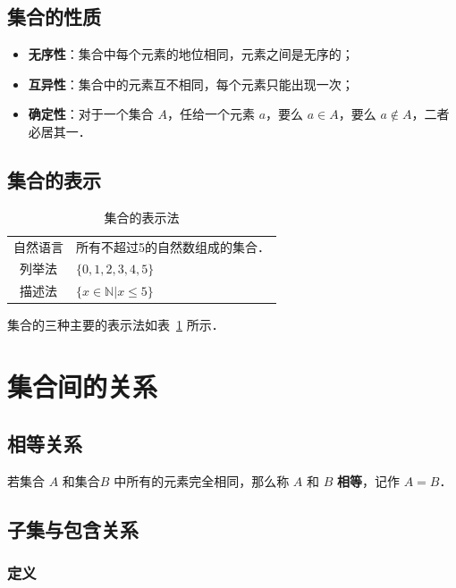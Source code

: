\documentclass[a4paper,openany]{ctexbook}
\begin{document}
\subsection{集合的性质}

\begin{itemize}
    \item \textbf{无序性}：集合中每个元素的地位相同，元素之间是无序的；
    \item \textbf{互异性}：集合中的元素互不相同，每个元素只能出现一次；
    \item \textbf{确定性}：对于一个集合 \(A\)，任给一个元素 \(a\)，要么 \(a \in A\)，要么 \(a \not\in A\)，二者必居其一．
\end{itemize}

\subsection{集合的表示}

\begin{table}
    \centering
    \begin{tabular}{cl}
        \toprule
        自然语言 & 所有不超过5的自然数组成的集合．    \\
        列举法   & \(\{0,1,2,3,4,5\}\)                \\
        描述法   & \(\{x \in \mathbb{N} | x \le 5\}\) \\
        \bottomrule
    \end{tabular}
    \caption{集合的表示法}\label{tbl:jihebnui}
\end{table}

集合的三种主要的表示法如表~\ref{tbl:jihebnui} 所示．

\section{集合间的关系}

\subsection{相等关系}

若集合 \(A\) 和集合\(B\) 中所有的元素完全相同，那么称 \(A\) 和 \(B\) \textbf{相等}，记作 \(A=B\)．

\subsection{子集与包含关系}

\subsubsection{定义}
\end{document}
